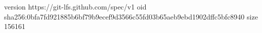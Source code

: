 version https://git-lfs.github.com/spec/v1
oid sha256:0bfa7fd921885b6bf79b9ecef9d3566c55fd03b65aeb9ebd1902dffc5bfc8940
size 156161
